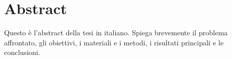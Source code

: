 \chapter*{Abstract}
Questo \`e l'abstract della tesi in italiano. Spiega brevemente il problema affrontato,
gli obiettivi, i materiali e i metodi, i risultati principali e le conclusioni.


